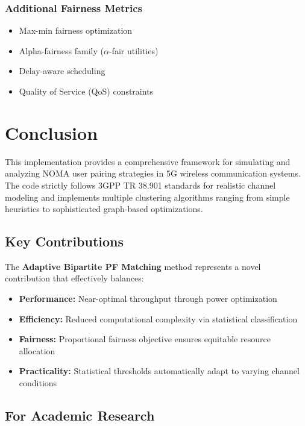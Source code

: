 \documentclass[12pt,a4paper]{article}
\begin{document}
\subsubsection{Additional Fairness Metrics}

\begin{itemize}
    \item Max-min fairness optimization
    \item Alpha-fairness family ($\alpha$-fair utilities)
    \item Delay-aware scheduling
    \item Quality of Service (QoS) constraints
\end{itemize}

\section{Conclusion}

This implementation provides a comprehensive framework for simulating and analyzing NOMA user pairing strategies in 5G wireless communication systems. The code strictly follows 3GPP TR 38.901 standards for realistic channel modeling and implements multiple clustering algorithms ranging from simple heuristics to sophisticated graph-based optimizations.

\subsection{Key Contributions}

The \textbf{Adaptive Bipartite PF Matching} method represents a novel contribution that effectively balances:

\begin{itemize}
    \item \textbf{Performance:} Near-optimal throughput through power optimization
    \item \textbf{Efficiency:} Reduced computational complexity via statistical classification
    \item \textbf{Fairness:} Proportional fairness objective ensures equitable resource allocation
    \item \textbf{Practicality:} Statistical thresholds automatically adapt to varying channel conditions
\end{itemize}

\subsection{For Academic Research}
\end{document}
